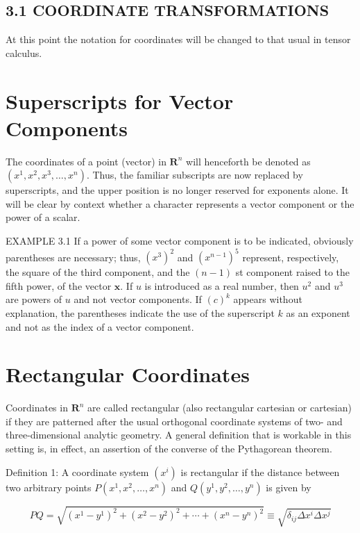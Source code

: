 \documentclass[10pt]{article}
\begin{document}
\subsection*{3.1 COORDINATE TRANSFORMATIONS}
At this point the notation for coordinates will be changed to that usual in tensor calculus.

\section*{Superscripts for Vector Components}
The coordinates of a point (vector) in $\mathbf{R}^{n}$ will henceforth be denoted as $\left(x^{1}, x^{2}, x^{3}, \ldots, x^{n}\right)$. Thus, the familiar subscripts are now replaced by superscripts, and the upper position is no longer reserved for exponents alone. It will be clear by context whether a character represents a vector component or the power of a scalar.

EXAMPLE 3.1 If a power of some vector component is to be indicated, obviously parentheses are necessary; thus, $\left(x^{3}\right)^{2}$ and $\left(x^{n-1}\right)^{5}$ represent, respectively, the square of the third component, and the $(n-1)$ st component raised to the fifth power, of the vector $\mathbf{x}$. If $u$ is introduced as a real number, then $u^{2}$ and $u^{3}$ are powers of $u$ and not vector components. If $(c)^{k}$ appears without explanation, the parentheses indicate the use of the superscript $k$ as an exponent and not as the index of a vector component.

\section*{Rectangular Coordinates}
Coordinates in $\mathbf{R}^{n}$ are called rectangular (also rectangular cartesian or cartesian) if they are patterned after the usual orthogonal coordinate systems of two- and three-dimensional analytic geometry. A general definition that is workable in this setting is, in effect, an assertion of the converse of the Pythagorean theorem.

Definition 1: A coordinate system $\left(x^{i}\right)$ is rectangular if the distance between two arbitrary points $P\left(x^{1}, x^{2}, \ldots, x^{n}\right)$ and $Q\left(y^{1}, y^{2}, \ldots, y^{n}\right)$ is given by

$$
P Q=\sqrt{\left(x^{1}-y^{1}\right)^{2}+\left(x^{2}-y^{2}\right)^{2}+\cdots+\left(x^{n}-y^{n}\right)^{2}} \equiv \sqrt{\delta_{i j} \Delta x^{i} \Delta x^{j}}
$$
\end{document}
